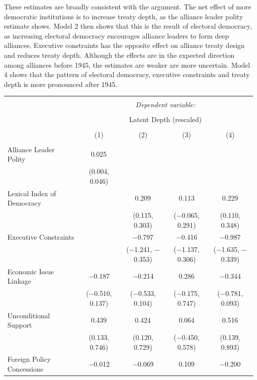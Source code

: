 \documentclass[12pt]{article}
\begin{document}
These estimates are broadly consistent with the argument. 
The net effect of more democratic institutions is to increase treaty depth, as the alliance leader polity estimate shows. 
Model 2 then shows that this is the result of electoral democracy, as increasing electoral democracy encourages alliance leaders to form deep alliances. 
Executive constraints has the opposite effect on alliance treaty design and reduces treaty depth. 
Although the effects are in the expected direction among alliances before 1945, the estimates are weaker are more uncertain. 
Model 4 shows that the pattern of electoral democracy, executive constraints and treaty depth is more pronounced after 1945. 


\begin{table}[!htbp] \centering 
\begin{tabular}{@{\extracolsep{5pt}}lcccc} 
\\[-1.8ex]\hline 
\hline \\[-1.8ex] 
 & \multicolumn{4}{c}{\textit{Dependent variable:}} \\ 
\cline{2-5} 
\\[-1.8ex] & \multicolumn{4}{c}{Latent Depth (rescaled)} \\ 
\\[-1.8ex] & (1) & (2) & (3) & (4)\\ 
\hline \\[-1.8ex] 
 Alliance Leader Polity & 0.025$^{}$ &  &  &  \\ 
  & (0.004, 0.046) &  &  &  \\ 
  Lexical Index of Democracy &  & 0.209$^{}$ & 0.113 & 0.229$^{}$ \\ 
  &  & (0.115, 0.303) & ($-$0.065, 0.291) & (0.110, 0.348) \\ 
  Executive Constraints &  & $-$0.797$^{}$ & $-$0.416 & $-$0.987$^{}$ \\ 
  &  & ($-$1.241, $-$0.353) & ($-$1.137, 0.306) & ($-$1.635, $-$0.339) \\ 
  Economic Issue Linkage & $-$0.187 & $-$0.214 & 0.286 & $-$0.344 \\ 
  & ($-$0.510, 0.137) & ($-$0.533, 0.104) & ($-$0.175, 0.747) & ($-$0.781, 0.093) \\ 
  Unconditional Support & 0.439$^{}$ & 0.424$^{}$ & 0.064 & 0.516$^{}$ \\ 
  & (0.133, 0.746) & (0.120, 0.729) & ($-$0.450, 0.578) & (0.139, 0.893) \\ 
  Foreign Policy Concessions & $-$0.012 & $-$0.069 & 0.109 & $-$0.200$^{}$ \\ 

\end{tabular}
\end{table}
\end{document}
